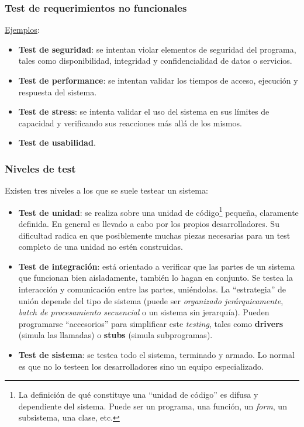 \documentclass[]{article}
\begin{document}
\subsubsection{Test de requerimientos no funcionales}
\underline{Ejemplos}:
\begin{itemize}
	\item \textbf{Test de seguridad}: se intentan violar elementos de seguridad del programa, tales como disponibilidad, integridad y confidencialidad de datos o servicios.
	\item \textbf{Test de performance}: se intentan validar los tiempos de acceso, ejecución y respuesta del sistema.
	\item \textbf{Test de stress}: se intenta validar el uso del sistema en sus límites de capacidad y verificando sus reacciones más allá de los mismos.
	\item \textbf{Test de usabilidad}.
\end{itemize}

\subsubsection{Niveles de test}
Existen tres niveles a los que se suele testear un sistema:
\begin{itemize}
	\item \textbf{Test de unidad}: se realiza sobre una unidad de código\footnote{La definición de qué constituye una ``unidad de código'' es difusa y dependiente del sistema. Puede ser un programa, una función, un \textit{form}, un subsistema, una clase, etc.} pequeña, claramente definida. En general es llevado a cabo por los propios desarrolladores. Su dificultad radica en que posiblemente muchas piezas necesarias para un test completo de una unidad no estén construidas.
	\item \textbf{Test de integración}: está orientado a verificar que las partes de un sistema que funcionan bien aisladamente, también lo hagan en conjunto. Se testea la interacción y comunicación entre las partes, uniéndolas. La ``estrategia'' de unión depende del tipo de sistema (puede ser \textit{organizado jerárquicamente}, \textit{batch de procesamiento secuencial} o un sistema sin jerarquía). Pueden programarse ``accesorios'' para simplificar este \textit{testing}, tales como \textbf{drivers} (simula las llamadas) o \textbf{stubs} (simula subprogramas).
	\item \textbf{Test de sistema}: se testea todo el sistema, terminado y armado. Lo normal es que no lo testeen los desarrolladores sino un equipo especializado.
\end{itemize}
\end{document}
